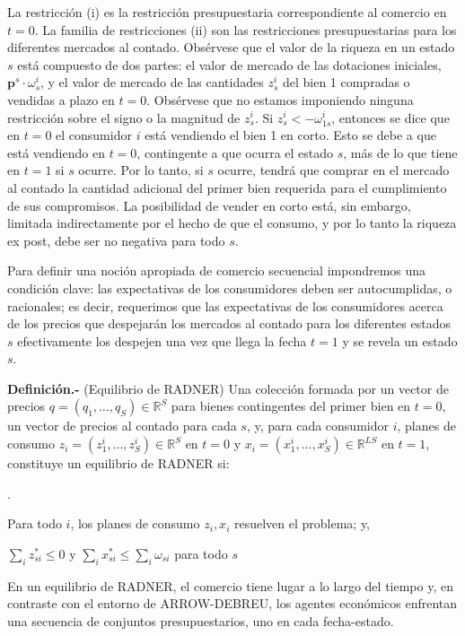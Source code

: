 \documentclass[10pt,a4paper]{article}
\newcounter{numitem}
\newenvironment{lnum}
      {\begin{list}{\arabic{numitem}.}{%
          \usecounter{numitem}%
          \setlength{\leftmargin}{1cm}%
          \setlength{\parskip}{3pt}%
          \setlength{\itemsep}{0pt}%
          \setlength{\parsep}{0pt}%
      }}
      {\end{list}}
\begin{document}
La restricción (i) es la restricción presupuestaria correspondiente al comercio en $t=0$. La familia de restricciones (ii) son las restricciones presupuestarias para los diferentes mercados al contado. Obsérvese que el valor de la riqueza en un estado $s$ está compuesto de dos partes: el valor de mercado de las dotaciones iniciales, $\mathbf p^s\cdot \omega^i_s$, y el valor de mercado de las cantidades $z^i_s$ del bien 1 compradas o vendidas a plazo en $t=0$. Obsérvese que no estamos imponiendo ninguna restricción sobre el signo o la magnitud de $z^i_s$. Si $z^i_s<-\omega^i_{1s}$, entonces se dice que en $t=0$ el consumidor $i$ está vendiendo el bien 1 en corto. Esto se debe a que está vendiendo en $t=0$, contingente a que ocurra el estado $s$, más de lo que tiene en $t=1$ si $s$ ocurre. Por lo tanto, si $s$ ocurre, tendrá que comprar en el mercado al contado la cantidad adicional del primer bien requerida para el cumplimiento de sus compromisos. La posibilidad de vender en corto está, sin embargo, limitada indirectamente por el hecho de que el consumo, y por lo tanto la riqueza ex post, debe ser no negativa para todo $s$.

Para definir una noción apropiada de comercio secuencial impondremos una condición clave: las expectativas de los consumidores deben ser autocumplidas, o racionales; es decir, requerimos que las expectativas de los consumidores acerca de los precios que despejarán los mercados al contado para los diferentes estados $s$ efectivamente los despejen una vez que llega la fecha $t=1$ y se revela un estado $s$.

\textbf{Definición.-} (Equilibrio de RADNER) Una colección formada por un vector de precios $q=(q_1,\ldots,q_S)\in\mathbb{R}^S$ para bienes contingentes del primer bien en $t=0$, un vector de precios al contado para cada $s$, y, para cada consumidor $i$, planes de consumo $z_i=(z^i_1,\ldots,z^i_S)\in\mathbb{R}^S$ en $t=0$ y $x_i=(x^i_1,\ldots,x^i_S)\in\mathbb{R}^{LS}$ en $t=1$, constituye un equilibrio de RADNER si:
\begin{lnum}
    \item Para todo $i$, los planes de consumo $z_i,x_i$ resuelven el problema; y,
    \item $\sum_iz_{si}^*\leq 0$ y $\sum_{i}x_{si}^*\leq\sum_i\omega_{si}$ para todo $s$
\end{lnum}

En un equilibrio de RADNER, el comercio tiene lugar a lo largo del tiempo y, en contraste con el entorno de ARROW-DEBREU, los agentes económicos enfrentan una secuencia de conjuntos presupuestarios, uno en cada fecha-estado.
\end{document}
